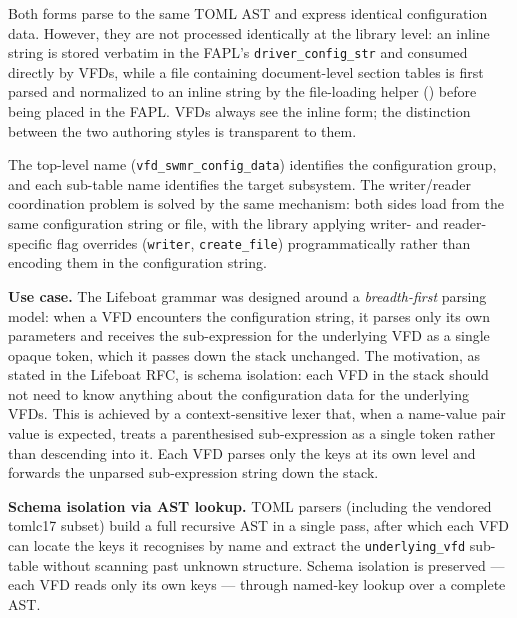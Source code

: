 \documentclass[../RFC-HDFG-2026-001.tex]{subfiles}
\begin{document}
Both forms parse to the same TOML AST and express identical configuration
data.  However, they are not processed identically at the library level: an
inline string is stored verbatim in the FAPL's \texttt{driver\_config\_str}
and consumed directly by VFDs, while a file containing document-level section
tables is first parsed and normalized to an inline string by the
file-loading helper () before being
placed in the FAPL.  VFDs always see the inline form; the distinction between
the two authoring styles is transparent to them.

The top-level name (\texttt{vfd\_swmr\_config\_data}) identifies the
configuration group, and each sub-table name identifies the target subsystem.
The writer/reader coordination
problem is solved by the same mechanism: both sides load from the same
configuration string or file, with the library applying writer- and
reader-specific flag overrides (\texttt{writer}, \texttt{create\_file})
programmatically rather than encoding them in the configuration string.


\textbf{Use case.}  The Lifeboat grammar was designed around a
\emph{breadth-first} parsing model: when a VFD encounters the configuration
string, it parses only its own parameters and receives the sub-expression for
the underlying VFD as a single opaque token, which it passes down the stack
unchanged.  The motivation, as stated in the Lifeboat RFC, is schema
isolation: each VFD in the stack should not need to know anything about the
configuration data for the underlying VFDs.  This is achieved by a
context-sensitive lexer that, when a name-value pair value is expected,
treats a parenthesised sub-expression as a single token rather than
descending into it.  Each VFD parses only the keys at its own level and
forwards the unparsed sub-expression string down the stack.

\textbf{Schema isolation via AST lookup.}  TOML parsers (including the
vendored tomlc17 subset) build a full recursive AST in a single pass, after
which each VFD can locate the keys it recognises by name and extract the
\texttt{underlying\_vfd} sub-table without scanning past unknown structure.
Schema isolation is preserved --- each VFD reads only its own keys --- through
named-key lookup over a complete AST.
\end{document}

